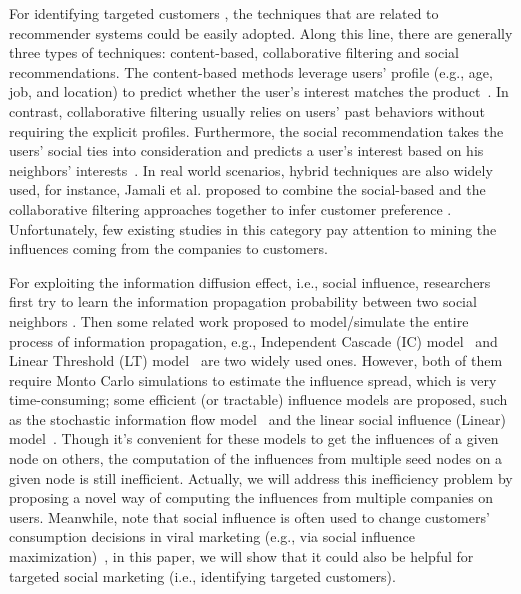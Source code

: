 \documentclass{llncs}
\begin{document}
For identifying targeted customers \cite{tang2013social,koren2009matrix}, the techniques that are related to recommender systems could be easily adopted. Along this line, there are generally three types of techniques: content-based, collaborative filtering and social recommendations. The content-based methods leverage users' profile (e.g., age, job, and location) to predict whether the user's interest matches the product~\cite{contentRS2007}. In contrast, collaborative filtering usually relies on users' past behaviors without requiring the explicit profiles\cite{cf2009survey}. Furthermore, the social recommendation takes the users' social ties into consideration and predicts a user's interest based on his neighbors' interests~\cite{tang2013social}. In real world scenarios, hybrid techniques are also widely used, for instance, Jamali et al. proposed to combine the social-based and the collaborative filtering approaches together to infer customer preference \cite{jamali2009trustwalker}. Unfortunately, few existing studies in this category pay attention to mining the influences coming from the companies to customers.


For exploiting the information diffusion effect, i.e., social influence, researchers first try to learn the information propagation probability between two social neighbors \cite{goyal2010learning,kdd13STRIP}.  Then some related work proposed to model/simulate the entire process of information propagation, e.g., Independent Cascade (IC) model~\cite{goldenberg2001talk} and Linear Threshold (LT) model~\cite{granovetter1978threshold} are two widely used ones. However, both of them require Monto Carlo simulations to estimate the influence spread, which is very time-consuming; some efficient (or tractable) influence models are proposed, such as the stochastic information flow model~\cite{aggarwal2011flow} and the linear social influence (Linear) model~\cite{ijcai13biaoxiang}. Though it's convenient for these models to get the influences of a given node on others, the computation of the influences from multiple seed nodes on a given node is still inefficient. Actually, we will address this inefficiency problem by proposing a novel way of computing the influences from multiple companies on users. Meanwhile, note that social influence is often used to change customers' consumption decisions in viral marketing (e.g., via social influence maximization)~\cite{kempe2003maximizing,chen2013information}, in this paper, we will show that it could also be helpful for targeted social marketing (i.e., identifying targeted customers).
\end{document}
